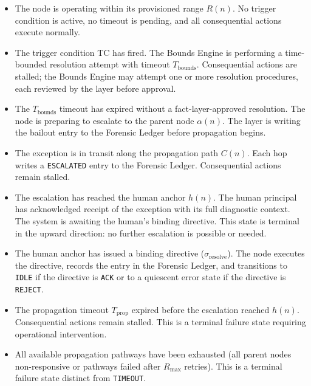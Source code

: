 \begin{itemize}\itemsep=0pt
\item[\texttt{IDLE}] The node is operating within its provisioned range $R(n)$. No trigger condition is active, no timeout is pending, and all consequential actions execute normally.

\item[\texttt{BOUNDED}] The trigger condition TC has fired. The Bounds Engine is performing a time-bounded resolution attempt with timeout $T_{\text{bounds}}$. Consequential actions are stalled; the Bounds Engine may attempt one or more resolution procedures, each reviewed by the \fact{} layer before approval.

\item[\texttt{BAIL\_PENDING}] The $T_{\text{bounds}}$ timeout has expired without a fact-layer-approved resolution. The node is preparing to escalate to the parent node $\alpha(n)$. The \fact{} layer is writing the bailout entry to the Forensic Ledger before propagation begins.

\item[\texttt{ESCALATING}] The exception is in transit along the propagation path $C(n)$. Each hop writes a \texttt{ESCALATED} entry to the Forensic Ledger. Consequential actions remain stalled.

\item[\texttt{HUMAN\_ACKNOWLEDGED}] The escalation has reached the human anchor $h(n)$. The human principal has acknowledged receipt of the exception with its full diagnostic context. The system is awaiting the human's binding directive. This state is terminal in the upward direction: no further escalation is possible or needed.

\item[\texttt{RESOLVED}] The human anchor has issued a binding directive ($\sigma_{\text{resolve}}$). The node executes the directive, records the entry in the Forensic Ledger, and transitions to \texttt{IDLE} if the directive is \texttt{ACK} or to a quiescent error state if the directive is \texttt{REJECT}.

\item[\texttt{TIMEOUT}] The propagation timeout $T_{\text{prop}}$ expired before the escalation reached $h(n)$. Consequential actions remain stalled. This is a terminal failure state requiring operational intervention.

\item[\texttt{PATHWAY\_EXHAUSTED}] All available propagation pathways have been exhausted (all parent nodes non-responsive or pathways failed after $R_{\max}$ retries). This is a terminal failure state distinct from \texttt{TIMEOUT}.
\end{itemize}


